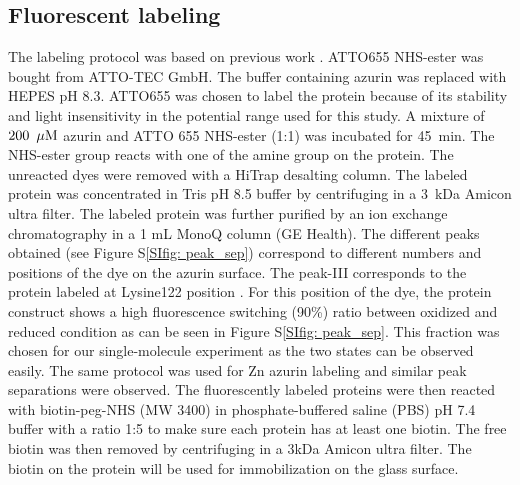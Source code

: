 \subsection{Fluorescent labeling}
The labeling protocol was based on previous work \cite{nicolardi2012topdown}. ATTO655 NHS-ester was bought from ATTO-TEC GmbH. The buffer containing azurin was replaced with HEPES pH 8.3. ATTO655 was chosen to label the protein because of its stability and light insensitivity in the potential range used for this study. A mixture of $200~\,\mu\textrm{M}$ azurin and ATTO 655 NHS-ester (1:1) was incubated for 45~min. The NHS-ester group reacts with one of the amine group on the protein. The unreacted dyes were removed with a HiTrap desalting column. The labeled protein was concentrated in Tris pH 8.5 buffer by centrifuging in a 3~kDa Amicon ultra filter. The labeled protein was further purified by an ion exchange chromatography in a 1 mL MonoQ column (GE Health). The different peaks obtained (see Figure S\ref{SIfig: peak_sep}) correspond to different numbers and positions of the dye on the azurin surface. The peak-III corresponds to the protein labeled at Lysine122 position \cite{nicolardi2012topdown}. For this position of the dye, the protein construct shows a high fluorescence switching (90\%) ratio between oxidized and reduced condition as can be seen in Figure S\ref{SIfig: peak_sep}. This fraction was chosen for our single-molecule experiment as the two states can be observed easily. The same protocol was used for Zn azurin labeling and similar peak separations were observed. The fluorescently labeled proteins were then reacted with biotin-peg-NHS (MW 3400) in phosphate-buffered saline (PBS) pH 7.4 buffer with a ratio 1:5 to make sure each protein has at least one biotin. The free biotin was then removed by centrifuging in a 3kDa Amicon ultra filter. The biotin on the protein will be used for immobilization on the glass surface.
